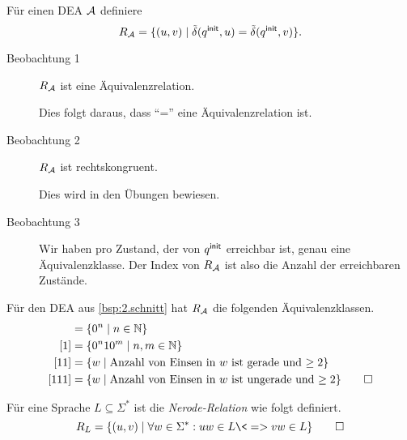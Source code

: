 \begin{Bsp} %
  \label{Bsp:R_m}
        Für einen \ac{DEA} $\mathcal{A}$ definiere
        \[ R_{\mathcal{A}} = \{(u,v) \mid \tilde\delta(q^\mathsf{init},u)=\tilde\delta(q^\mathsf{init},v)\}. \]
        \begin{description}
                \item[Beobachtung 1] $R_{\mathcal{A}}$ ist eine Äquivalenzrelation.
                
                Dies folgt daraus, dass "`="' eine Äquivalenzrelation ist.
                \item[Beobachtung 2] $R_{\mathcal{A}}$ ist rechtskongruent. 
                
                Dies wird in den Übungen bewiesen.
                \item[Beobachtung 3] Wir haben pro Zustand, der von $q^\mathsf{init}$ erreichbar ist, genau eine Äquivalenzklasse.
                Der Index von $R_{\mathcal{A}}$ ist also die Anzahl der erreichbaren Zustände.
        \end{description}
        
        \medskip
        
        Für den \ac{DEA} aus \autoref{bsp:2.schnitt} hat $R_{\mathcal{A}}$ die folgenden Äquivalenzklassen.
        \begin{align*}
        [\Eps] &= \{0^n\mid n\in \N\}\\
        [1] &= \{0^n10^m\mid n,m\in \N\}\\
        [11] &= \{w\mid \text{Anzahl von Einsen in $w$ ist gerade und $\geq 2$}\}\\
        [111] &= \{w\mid \text{Anzahl von Einsen in $w$ ist ungerade und $\geq 2$}\}
        \qedhere
        \end{align*}
\end{Bsp}
\begin{Def}
        Für eine Sprache $L\subseteq \Sigma^*$ ist die \emph{Nerode-Relation} wie folgt definiert.
        \[
        R_L = \{(u,v) \mid \forall w\in\Sigma^*: uw\in L \<=> vw\in L \}
        \qedhere
        \]
\end{Def}
